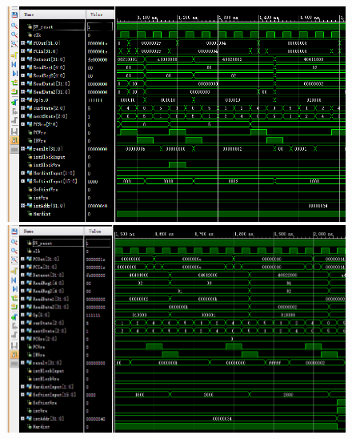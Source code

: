 \documentclass{article}
\begin{document}
\begin{appendices}
\begin{figure}[!h]
\centering
\includegraphics[scale=0.49]{../pics/img_3.png}
\includegraphics[scale=0.48]{../pics/img_4.png}
\end{figure}

\newpage


\end{appendices}
\end{document}
